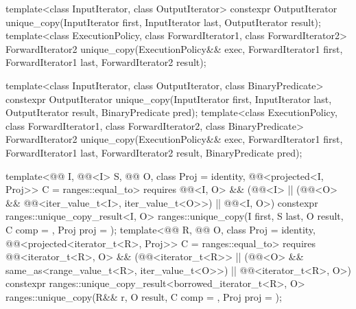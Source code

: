 %
\begin{itemdecl}
template<class InputIterator, class OutputIterator>
  constexpr OutputIterator
    unique_copy(InputIterator first, InputIterator last,
                OutputIterator result);
template<class ExecutionPolicy, class ForwardIterator1, class ForwardIterator2>
  ForwardIterator2
    unique_copy(ExecutionPolicy&& exec,
                ForwardIterator1 first, ForwardIterator1 last,
                ForwardIterator2 result);

template<class InputIterator, class OutputIterator,
         class BinaryPredicate>
  constexpr OutputIterator
    unique_copy(InputIterator first, InputIterator last,
                OutputIterator result, BinaryPredicate pred);
template<class ExecutionPolicy, class ForwardIterator1, class ForwardIterator2,
         class BinaryPredicate>
  ForwardIterator2
    unique_copy(ExecutionPolicy&& exec,
                ForwardIterator1 first, ForwardIterator1 last,
                ForwardIterator2 result, BinaryPredicate pred);

template<@@ I, @@<I> S, @@ O, class Proj = identity,
         @@<projected<I, Proj>> C = ranges::equal_to>
  requires @@<I, O> &&
           (@@<I> ||
            (@@<O> && @@<iter_value_t<I>, iter_value_t<O>>) ||
            @@<I, O>)
  constexpr ranges::unique_copy_result<I, O>
    ranges::unique_copy(I first, S last, O result, C comp = {}, Proj proj = {});
template<@@ R, @@ O, class Proj = identity,
         @@<projected<iterator_t<R>, Proj>> C = ranges::equal_to>
  requires @@<iterator_t<R>, O> &&
           (@@<iterator_t<R>> ||
            (@@<O> && same_as<range_value_t<R>, iter_value_t<O>>) ||
            @@<iterator_t<R>, O>)
  constexpr ranges::unique_copy_result<borrowed_iterator_t<R>, O>
    ranges::unique_copy(R&& r, O result, C comp = {}, Proj proj = {});
\end{itemdecl}

